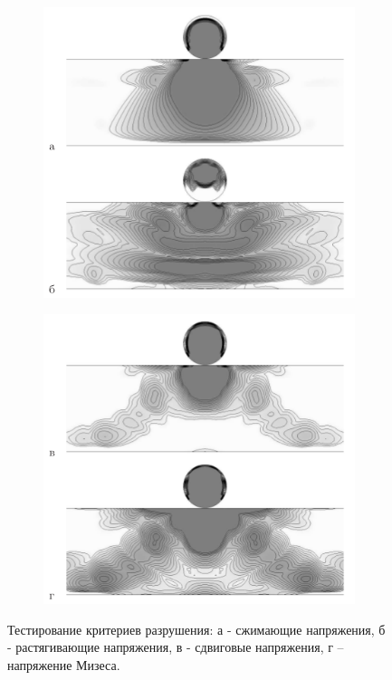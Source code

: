 \begin{figure}[htp]
\centering
\begin{subfigure}[b]{0.45\textwidth}
\centering
\includegraphics[width=\textwidth]{png/destruction_test-1.png}
\end{subfigure}
\begin{subfigure}[b]{0.45\textwidth}
\centering
\includegraphics[width=\textwidth]{png/destruction_test-2.png}
\end{subfigure}
\caption{Тестирование критериев разрушения: а - сжимающие напряжения, б - растягивающие напряжения, в - сдвиговые напряжения, г – напряжение Мизеса.}
\label{pic:destruction_test}
\end{figure}

